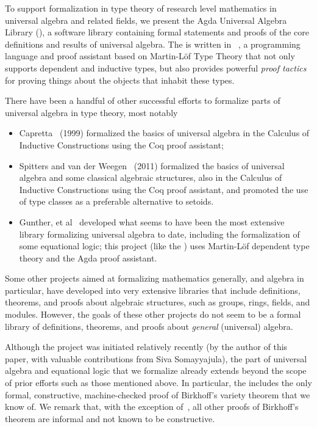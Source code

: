To support formalization in type theory of research level mathematics in universal algebra and related fields, we present the Agda Universal Algebra Library (\agdaualib), a software library containing formal statements and proofs of the core definitions and results of universal algebra. 
The \agdaualib is written in \agda~\cite{Norell:2009}, a programming language and proof assistant based on Martin-L\"of Type Theory that not only supports dependent and inductive types, but also provides powerful \emph{proof tactics} for proving things about the objects that inhabit these types.

There have been a handful of other successful efforts to formalize parts of universal algebra in type theory, most notably
\begin{itemize}
  \item Capretta~\cite{Capretta:1999} (1999) formalized the basics of universal algebra in the Calculus of Inductive Constructions using the Coq proof assistant;
    \item Spitters and van der Weegen~\cite{Spitters:2011} (2011) formalized the basics of universal algebra and some classical algebraic structures, also in the Calculus of Inductive Constructions using the Coq proof assistant, and promoted the use of type classes as a preferable alternative to setoids.
 \item Gunther, et al~\cite{Gunther:2018} developed what seems to have been the most extensive library formalizing universal algebra to date, including the formalization of some equational logic; this project (like the \ualib) uses Martin-L\"of dependent type theory and the Agda proof assistant.
\end{itemize}
Some other projects aimed at formalizing mathematics generally, and algebra in particular, have developed into very extensive libraries that include definitions, theorems, and proofs about algebraic structures, such as groups, rings, fields, and modules.  However, the goals of these other projects do not seem to be a formal library of definitions, theorems, and proofs about \textit{general} (universal) algebra.

Although the \ualib project was initiated relatively recently (by the author of this paper, with valuable contributions from Siva Somayyajula), the part of universal algebra and equational logic that we formalize already extends beyond the scope of prior efforts such as those mentioned above.  In particular, the \ualib includes the only formal, constructive, machine-checked proof of Birkhoff's variety theorem that we know of. We remark that, with the exception of~\cite{Carstrom:2008}, all other proofs of Birkhoff's theorem are informal and not known to be constructive.

